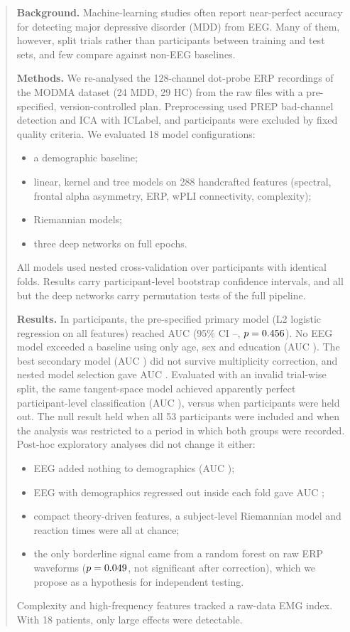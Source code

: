 \begin{abstract}
\noindent\textbf{Background.} Machine-learning studies often report near-perfect accuracy for detecting major
depressive disorder (MDD) from EEG. Many of them, however, split trials rather than participants between training and
test sets, and few compare against non-EEG baselines.

\noindent\textbf{Methods.} We re-analysed the 128-channel dot-probe ERP recordings of the MODMA dataset (24 MDD, 29 HC)
from the raw files with a pre-specified, version-controlled plan. Preprocessing used PREP bad-channel detection and
ICA with ICLabel, and participants were excluded by fixed quality criteria. We evaluated 18 model configurations:
\begin{itemize}
  \item a demographic baseline;
  \item linear, kernel and tree models on 288 handcrafted features (spectral, frontal alpha asymmetry, ERP, wPLI
        connectivity, complexity);
  \item Riemannian models;
  \item three deep networks on full epochs.
\end{itemize}
All models used nested cross-validation over participants with identical folds. Results carry participant-level
bootstrap confidence intervals, and all but the deep networks carry permutation tests of the full pipeline.

\noindent\textbf{Results.} In \NIncluded{} participants, the pre-specified primary model (L2 logistic regression on all
features) reached AUC \PrimaryLrLAllAuc{} (95\% CI \PrimaryLrLAllAucLo--\PrimaryLrLAllAucHi, $p=\PrimaryLrLAllPperm$).
No EEG model exceeded a baseline using only age, sex and education (AUC \DemographicsLrAuc). The best secondary model
(AUC \LrLAllAuc) did not survive multiplicity correction, and nested model selection gave AUC
\NestedmodelselectionAllAuc. Evaluated with an invalid trial-wise split, the same tangent-space model achieved apparently perfect
participant-level classification (AUC \InflTsLrTrialSplitSubjectAuc), versus \InflTsLrSubjectSplitSubjectAuc{} when
participants were held out. The null
result held when all 53 participants were included and when the analysis was restricted to a period in which both
groups were recorded. Post-hoc exploratory analyses did not change it either:
\begin{itemize}
  \item EEG added nothing to demographics (AUC \AudDemoPlusEEGAllAuc);
  \item EEG with demographics regressed out inside each fold gave AUC \AudEEGAlldeconfoundedAuc;
  \item compact theory-driven features, a subject-level Riemannian model and reaction times were all at chance;
  \item the only borderline signal came from a random forest on raw ERP waveforms ($p=\AudRawRfP$, not significant after correction), which we propose as a hypothesis for independent testing.
\end{itemize}
Complexity and high-frequency features tracked a raw-data EMG index. With 18 patients, only large effects were
detectable.


\end{abstract}
